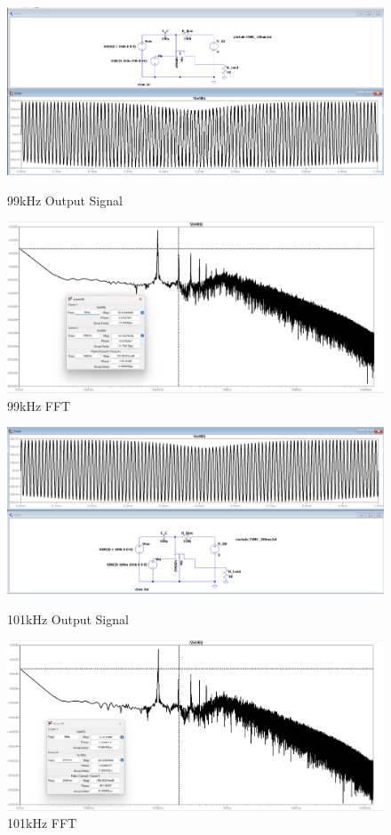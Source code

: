 \begin{figure}
    \centering
    \includegraphics[width=1\linewidth]{fig/99.png}
    \caption{99kHz Output Signal}
    \includegraphics[width=1\linewidth]{fig/99fft.png}
    \caption{99kHz FFT}
\end{figure}
\begin{figure}
    \centering
    \includegraphics[width=1\linewidth]{fig/101.png}
    \caption{101kHz Output Signal}
    \includegraphics[width=1\linewidth]{fig/101fft.png}
    \caption{101kHz FFT}
\end{figure}
